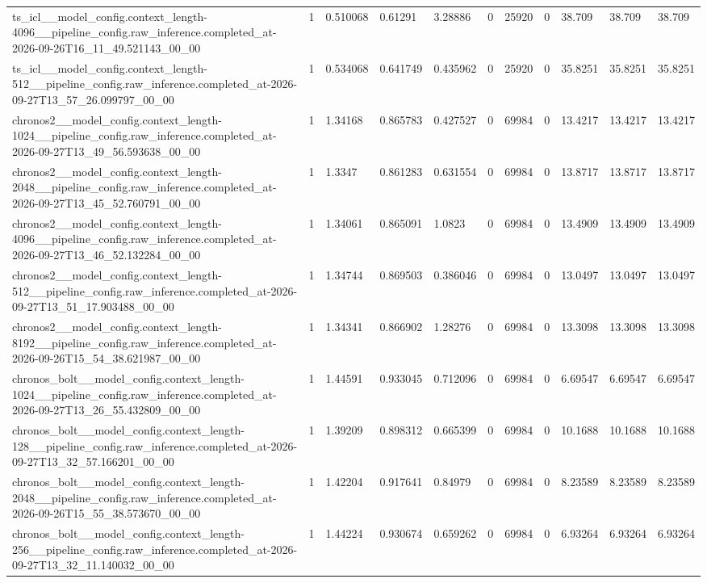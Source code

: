 \begin{tabular}{lllllllllll}
ts\_icl\_\_model\_config.context\_length-4096\_\_pipeline\_config.raw\_inference.completed\_at-2026-09-26T16\_11\_49.521143\_00\_00 & 1 & 0.510068 & 0.61291 & 3.28886 & 0 & 25920 & 0 & 38.709 & 38.709 & 38.709 \\
ts\_icl\_\_model\_config.context\_length-512\_\_pipeline\_config.raw\_inference.completed\_at-2026-09-27T13\_57\_26.099797\_00\_00 & 1 & 0.534068 & 0.641749 & 0.435962 & 0 & 25920 & 0 & 35.8251 & 35.8251 & 35.8251 \\
chronos2\_\_model\_config.context\_length-1024\_\_pipeline\_config.raw\_inference.completed\_at-2026-09-27T13\_49\_56.593638\_00\_00 & 1 & 1.34168 & 0.865783 & 0.427527 & 0 & 69984 & 0 & 13.4217 & 13.4217 & 13.4217 \\
chronos2\_\_model\_config.context\_length-2048\_\_pipeline\_config.raw\_inference.completed\_at-2026-09-27T13\_45\_52.760791\_00\_00 & 1 & 1.3347 & 0.861283 & 0.631554 & 0 & 69984 & 0 & 13.8717 & 13.8717 & 13.8717 \\
chronos2\_\_model\_config.context\_length-4096\_\_pipeline\_config.raw\_inference.completed\_at-2026-09-27T13\_46\_52.132284\_00\_00 & 1 & 1.34061 & 0.865091 & 1.0823 & 0 & 69984 & 0 & 13.4909 & 13.4909 & 13.4909 \\
chronos2\_\_model\_config.context\_length-512\_\_pipeline\_config.raw\_inference.completed\_at-2026-09-27T13\_51\_17.903488\_00\_00 & 1 & 1.34744 & 0.869503 & 0.386046 & 0 & 69984 & 0 & 13.0497 & 13.0497 & 13.0497 \\
chronos2\_\_model\_config.context\_length-8192\_\_pipeline\_config.raw\_inference.completed\_at-2026-09-26T15\_54\_38.621987\_00\_00 & 1 & 1.34341 & 0.866902 & 1.28276 & 0 & 69984 & 0 & 13.3098 & 13.3098 & 13.3098 \\
chronos\_bolt\_\_model\_config.context\_length-1024\_\_pipeline\_config.raw\_inference.completed\_at-2026-09-27T13\_26\_55.432809\_00\_00 & 1 & 1.44591 & 0.933045 & 0.712096 & 0 & 69984 & 0 & 6.69547 & 6.69547 & 6.69547 \\
chronos\_bolt\_\_model\_config.context\_length-128\_\_pipeline\_config.raw\_inference.completed\_at-2026-09-27T13\_32\_57.166201\_00\_00 & 1 & 1.39209 & 0.898312 & 0.665399 & 0 & 69984 & 0 & 10.1688 & 10.1688 & 10.1688 \\
chronos\_bolt\_\_model\_config.context\_length-2048\_\_pipeline\_config.raw\_inference.completed\_at-2026-09-26T15\_55\_38.573670\_00\_00 & 1 & 1.42204 & 0.917641 & 0.84979 & 0 & 69984 & 0 & 8.23589 & 8.23589 & 8.23589 \\
chronos\_bolt\_\_model\_config.context\_length-256\_\_pipeline\_config.raw\_inference.completed\_at-2026-09-27T13\_32\_11.140032\_00\_00 & 1 & 1.44224 & 0.930674 & 0.659262 & 0 & 69984 & 0 & 6.93264 & 6.93264 & 6.93264 \\

\end{tabular}
